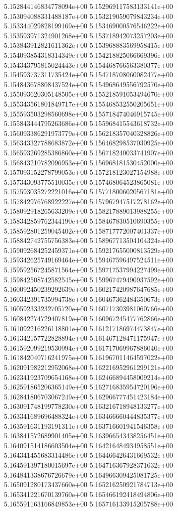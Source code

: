 5.152844146834778094e+00
5.152969117583133141e+00
5.153094088331488187e+00
5.153219059079843234e+00
5.153344029828199169e+00
5.153469000576546222e+00
5.153593971324901268e+00
5.153718942073257203e+00
5.153843912821611362e+00
5.153968883569958415e+00
5.154093854318314349e+00
5.154218825066669396e+00
5.154343795815024443e+00
5.154468766563380377e+00
5.154593737311735424e+00
5.154718708060082477e+00
5.154843678808437524e+00
5.154968649556792570e+00
5.155093620305148505e+00
5.155218591053494670e+00
5.155343561801849717e+00
5.155468532550205651e+00
5.155593503298560698e+00
5.155718474046915745e+00
5.155843444795263686e+00
5.155968415543618732e+00
5.156093386291973779e+00
5.156218357040328826e+00
5.156343327788683872e+00
5.156468298537030925e+00
5.156593269285386860e+00
5.156718240033741907e+00
5.156843210782096953e+00
5.156968181530452000e+00
5.157093152278799053e+00
5.157218123027154988e+00
5.157343093775510035e+00
5.157468064523865081e+00
5.157593035272221016e+00
5.157718006020567181e+00
5.157842976768922227e+00
5.157967947517278162e+00
5.158092918265633209e+00
5.158217889013988255e+00
5.158342859762344190e+00
5.158467830510690355e+00
5.158592801259045402e+00
5.158717772007401337e+00
5.158842742755756383e+00
5.158967713504104324e+00
5.159092684252459371e+00
5.159217655000813529e+00
5.159342625749169464e+00
5.159467596497524511e+00
5.159592567245871564e+00
5.159717537994227499e+00
5.159842508742582545e+00
5.159967479490937592e+00
5.160092450239292639e+00
5.160217420987647685e+00
5.160342391735994738e+00
5.160467362484350673e+00
5.160592333232705720e+00
5.160717303981060766e+00
5.160842274729407819e+00
5.160967245477762866e+00
5.161092216226118801e+00
5.161217186974473847e+00
5.161342157722828894e+00
5.161467128471175947e+00
5.161592099219530994e+00
5.161717069967886040e+00
5.161842040716241975e+00
5.161967011464597022e+00
5.162091982212952068e+00
5.162216952961299121e+00
5.162341923709654168e+00
5.162466894458009214e+00
5.162591865206365149e+00
5.162716835954720196e+00
5.162841806703067249e+00
5.162966777451423184e+00
5.163091748199778230e+00
5.163216718948133277e+00
5.163341689696488324e+00
5.163466660444835377e+00
5.163591631193191311e+00
5.163716601941546358e+00
5.163841572689901405e+00
5.163966543438256451e+00
5.164091514186603504e+00
5.164216484934958551e+00
5.164341455683314486e+00
5.164466426431669532e+00
5.164591397180015697e+00
5.164716367928371632e+00
5.164841338676726679e+00
5.164966309425081725e+00
5.165091280173437660e+00
5.165216250921784713e+00
5.165341221670139760e+00
5.165466192418494806e+00
5.165591163166849853e+00
5.165716133915205788e+00
